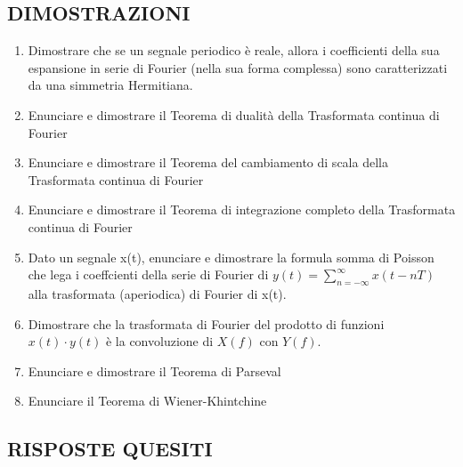 \documentclass[
  paper=a4,
  ,captions=tableheading
]{scrartcl}
\providecommand{\tightlist}{%
  \setlength{\itemsep}{0pt}\setlength{\parskip}{0pt}}
\begin{document}
\subsection{DIMOSTRAZIONI}\label{dimostrazioni}

\begin{enumerate}
\def\labelenumi{\arabic{enumi}.}
\tightlist
\item
  Dimostrare che se un segnale periodico è reale, allora i coefficienti
  della sua espansione in serie di Fourier (nella sua forma complessa)
  sono caratterizzati da una simmetria Hermitiana.
\item
  Enunciare e dimostrare il Teorema di dualità della Trasformata
  continua di Fourier
\item
  Enunciare e dimostrare il Teorema del cambiamento di scala della
  Trasformata continua di Fourier
\item
  Enunciare e dimostrare il Teorema di integrazione completo della
  Trasformata continua di Fourier
\item
  Dato un segnale x(t), enunciare e dimostrare la formula somma di
  Poisson che lega i coeffcienti della serie di Fourier di
  \(\displaystyle y(t) = \sum_{n = -\infty}^{\infty} x(t - nT)\) alla
  trasformata (aperiodica) di Fourier di x(t).
\item
  Dimostrare che la trasformata di Fourier del prodotto di funzioni
  \(x(t) \cdot y(t)\) è la convoluzione di \(X(f)\) con \(Y (f)\).
\item
  Enunciare e dimostrare il Teorema di Parseval
\item
  Enunciare il Teorema di Wiener-Khintchine
\end{enumerate}

\newpage

\subsection{RISPOSTE QUESITI}\label{risposte-quesiti}
\end{document}
